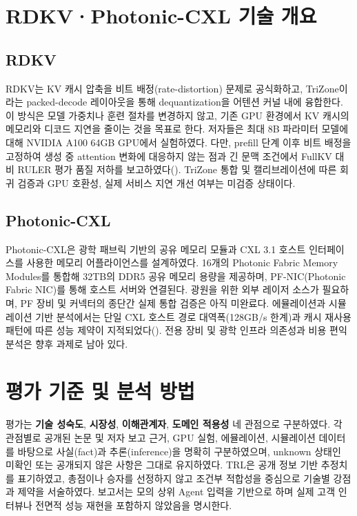 \documentclass[11pt,a4paper]{article}
\begin{document}
\section{RDKV·Photonic-CXL 기술 개요}

\subsection{RDKV}
RDKV는 KV 캐시 압축을 비트 배정(rate-distortion) 문제로 공식화하고, TriZone이라는 packed-decode 레이아웃을 통해 dequantization을 어텐션 커널 내에 융합한다. 이 방식은 모델 가중치나 훈련 절차를 변경하지 않고, 기존 GPU 환경에서 KV 캐시의 메모리와 디코드 지연을 줄이는 것을 목표로 한다. 저자들은 최대 8B 파라미터 모델에 대해 NVIDIA A100 64GB GPU에서 실험하였다. 다만, prefill 단계 이후 비트 배정을 고정하여 생성 중 attention 변화에 대응하지 않는 점과 긴 문맥 조건에서 FullKV 대비 RULER 평가 품질 저하를 보고하였다(\cite{SW01_RDKV}). TriZone 통합 및 캘리브레이션에 따른 회귀 검증과 GPU 호환성, 실제 서비스 지연 개선 여부는 미검증 상태이다.

\subsection{Photonic-CXL}
Photonic-CXL은 광학 패브릭 기반의 공유 메모리 모듈과 CXL 3.1 호스트 인터페이스를 사용한 메모리 어플라이언스를 설계하였다. 16개의 Photonic Fabric Memory Modules를 통합해 32TB의 DDR5 공유 메모리 용량을 제공하며, PF-NIC(Photonic Fabric NIC)를 통해 호스트 서버와 연결된다. 광원을 위한 외부 레이저 소스가 필요하며, PF 장비 및 커넥터의 종단간 실제 통합 검증은 아직 미완료다. 에뮬레이션과 시뮬레이션 기반 분석에서는 단일 CXL 호스트 경로 대역폭(128GB/s 한계)과 캐시 재사용 패턴에 따른 성능 제약이 지적되었다(\cite{HW01_PHOTONIC_CXL}). 전용 장비 및 광학 인프라 의존성과 비용 편익 분석은 향후 과제로 남아 있다.

\section{평가 기준 및 분석 방법}
평가는 \textbf{기술 성숙도}, \textbf{시장성}, \textbf{이해관계자}, \textbf{도메인 적용성} 네 관점으로 구분하였다. 각 관점별로 공개된 논문 및 저자 보고 근거, GPU 실험, 에뮬레이션, 시뮬레이션 데이터를 바탕으로 사실(fact)과 추론(inference)을 명확히 구분하였으며, unknown 상태인 미확인 또는 공개되지 않은 사항은 그대로 유지하였다. TRL은 공개 정보 기반 추정치를 표기하였고, 총점이나 승자를 선정하지 않고 조건부 적합성을 중심으로 기술별 강점과 제약을 서술하였다. 보고서는 모의 상위 Agent 입력을 기반으로 하며 실제 고객 인터뷰나 전면적 성능 재현을 포함하지 않았음을 명시한다.
\end{document}
